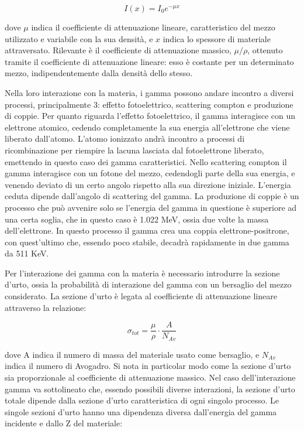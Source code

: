 \documentclass[a4paper,10pt]{article}
\begin{document}
\begin{equation}
	I(x)=I_{0}e^{-\mu x}
\end{equation}

dove $\mu$ indica il coefficiente di attenuazione lineare, caratteristico del mezzo utilizzato e variabile con la sua densità, e $x$ indica lo spessore di materiale attraversato. Rilevante è il coefficiente di attenuazione massico, $\mu/\rho$, ottenuto tramite il coefficiente di attenuazione lineare: esso è costante per un determinato mezzo, indipendentemente dalla densità dello stesso. 

Nella loro interazione con la materia, i gamma possono andare incontro a diversi processi, principalmente 3: effetto fotoelettrico, scattering compton e produzione di coppie. Per quanto riguarda l'effetto fotoelettrico, il gamma interagisce con un elettrone atomico, cedendo completamente la sua energia all'elettrone che viene liberato dall'atomo. L'atomo ionizzato andrà incontro a processi di ricombinazione per riempire la lacuna lasciata dal fotoelettrone liberato, emettendo in questo caso dei gamma caratteristici. Nello scattering compton il gamma interagisce con un fotone del mezzo, cedendogli parte della sua energia, e venendo deviato di un certo angolo rispetto alla sua direzione iniziale. L'energia ceduta dipende dall'angolo di scattering del gamma. La produzione di coppie è un processo che può avvenire solo se l'energia del gamma in questione è superiore ad una certa soglia, che in questo caso è 1.022 MeV, ossia due volte la massa dell'elettrone. In questo processo il gamma crea una coppia  elettrone-positrone, con quest'ultimo che, essendo poco stabile, decadrà rapidamente in due gamma da 511 KeV. 

Per l'interazione dei gamma con la materia è necessario introdurre la sezione d'urto, ossia la probabilità di interazione del gamma con un bersaglio del mezzo considerato. La sezione d'urto è legata al coefficiente di attenuazione lineare attraverso la relazione:

\begin{equation}
	\sigma_{tot}=\frac{\mu}{\rho} \cdot \frac{A}{N_{Av}}
\end{equation}

dove A indica il numero di massa del materiale usato come bersaglio, e $N_{Av}$ indica il numero di Avogadro. Si nota in particolar modo come la sezione d'urto sia proporzionale al coefficiente di attenuazione massico. Nel caso dell'interazione gamma va sottolineato che, essendo possibili diverse interazioni, la sezione d'urto totale dipende dalla sezione d'urto caratteristica di ogni singolo processo. Le singole sezioni d'urto hanno una dipendenza diversa dall'energia del gamma incidente e dallo Z del materiale:
\end{document}
